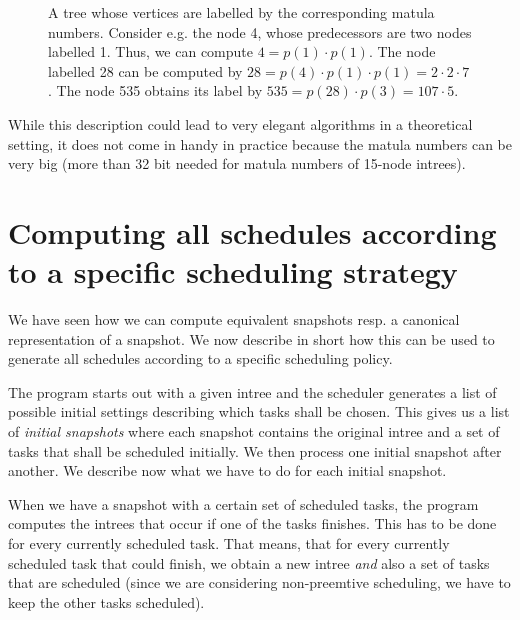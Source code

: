 \begin{description}
\begin{figure}[t]
  \caption{A tree whose vertices are labelled by the corresponding matula numbers. Consider e.g. the node 4, whose predecessors are two nodes labelled 1. Thus, we can compute $4=p(1)\cdot p(1)$. The node labelled 28 can be computed by $28 = p(4)\cdot p(1) \cdot p(1) = 2\cdot 2 \cdot 7$. The node 535 obtains its label by $535=p(28)\cdot p(3) = 107\cdot 5$.}
  \label{fig:matula-illustration}
\end{figure}

While this description could lead to very elegant algorithms in a theoretical setting, it does not come in handy in practice because the matula numbers can be very big (more than 32 bit needed for matula numbers of 15-node intrees).
\end{description}

\section{Computing all schedules according to a specific scheduling strategy}
\label{sec:implementation-computing-all-schedules}

We have seen how we can compute equivalent snapshots resp. a canonical representation of a snapshot. We now describe in short how this can be used to generate all schedules according to a specific scheduling policy.

The program starts out with a given intree and the scheduler generates a list of possible initial settings describing which tasks shall be chosen. This gives us a list of \emph{initial snapshots} where each snapshot contains the original intree and a set of tasks that shall be scheduled initially. We then process one initial snapshot after another. We describe now what we have to do for each initial snapshot.

When we have a snapshot with a certain set of scheduled tasks, the program computes the intrees that occur if one of the tasks finishes. This has to be done for every currently scheduled task. That means, that for every currently scheduled task that could finish, we obtain a new intree \emph{and} also a set of tasks that are scheduled (since we are considering non-preemtive scheduling, we have to keep the other tasks scheduled).

